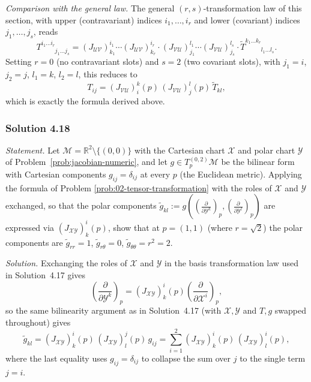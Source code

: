 \documentclass[11pt]{article}
\begin{document}
\emph{Comparison with the general law.} The general $(r,s)$-transformation
law of this section, with upper (contravariant) indices $i_1,\dots,i_r$
and lower (covariant) indices $j_1,\dots,j_s$, reads
\[
T^{i_1\dots i_r}_{\phantom{i_1\dots i_r}j_1\dots j_s} = (J_{\mathcal{UV}})^{i_1}_{k_1}\cdots(J_{\mathcal{UV}})^{i_r}_{k_r}\cdot(J_{\mathcal{VU}})^{l_1}_{j_1}\cdots(J_{\mathcal{VU}})^{l_s}_{j_s}\cdot\widetilde T^{k_1\dots k_r}_{\phantom{k_1\dots k_r}l_1\dots l_s}.
\]
Setting $r=0$ (no contravariant slots) and $s=2$ (two covariant slots),
with $j_1=i$, $j_2=j$, $l_1=k$, $l_2=l$, this reduces to
\[
T_{ij} = (J_{\mathcal{VU}})^k_i(p)\,(J_{\mathcal{VU}})^l_j(p)\,\widetilde T_{kl},
\]
which is exactly the formula derived above.

\subsubsection*{Solution 4.18}

\noindent\textit{Statement.} Let $\mathcal M=\mathbb R^2\setminus\{(0,0)\}$
with the Cartesian chart $\mathcal X$ and polar chart $\mathcal Y$ of
Problem~\ref{prob:jacobian-numeric}, and let $g\in T_p^{(0,2)}\mathcal M$
be the bilinear form with Cartesian components $g_{ij}=\delta_{ij}$ at
every $p$ (the Euclidean metric). Applying the formula of Problem
\ref{prob:02-tensor-transformation} with the roles of $\mathcal X$ and
$\mathcal Y$ exchanged, so that the polar components $\widetilde
g_{kl}:=g\!\left(\left(\frac{\partial}{\partial\mathcal
Y^k}\right)_p,\left(\frac{\partial}{\partial\mathcal Y^l}\right)_p\right)$
are expressed via $(J_{\mathcal{XY}})^i_k(p)$, show that at $p=(1,1)$
(where $r=\sqrt2$) the polar components are $\widetilde g_{rr}=1$,
$\widetilde g_{r\theta}=0$, $\widetilde g_{\theta\theta}=r^2=2$.

\medskip
\noindent\textit{Solution.} Exchanging the roles of $\mathcal X$ and
$\mathcal Y$ in the basis transformation law used in Solution~4.17 gives
\[
\left(\frac{\partial}{\partial\mathcal Y^k}\right)_p = (J_{\mathcal{XY}})^i_k(p)\left(\frac{\partial}{\partial\mathcal X^i}\right)_p,
\]
so the same bilinearity argument as in Solution~4.17 (with $\mathcal
X,\mathcal Y$ and $T,g$ swapped throughout) gives
\[
\widetilde g_{kl} = (J_{\mathcal{XY}})^i_k(p)\,(J_{\mathcal{XY}})^j_l(p)\,g_{ij} = \sum_{i=1}^2 (J_{\mathcal{XY}})^i_k(p)\,(J_{\mathcal{XY}})^i_l(p),
\]
where the last equality uses $g_{ij}=\delta_{ij}$ to collapse the sum over
$j$ to the single term $j=i$.
\end{document}
